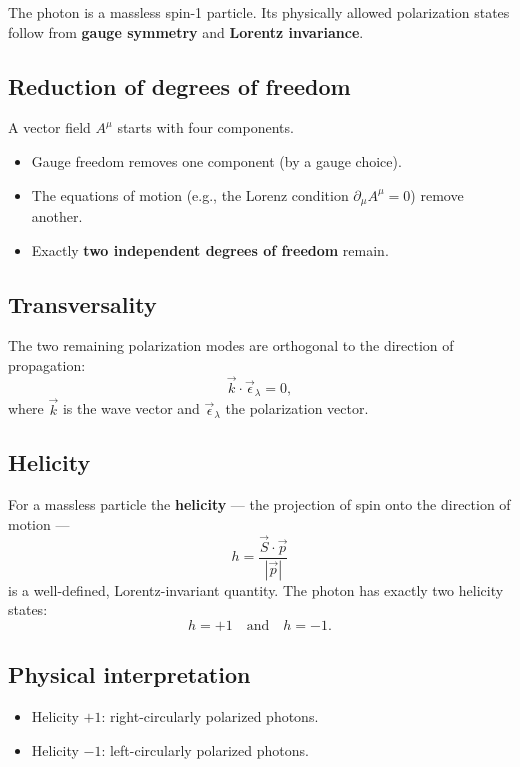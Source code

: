The photon is a massless spin-1 particle. Its physically allowed polarization states
follow from \textbf{gauge symmetry} and \textbf{Lorentz invariance}.

\subsection*{Reduction of degrees of freedom}
A vector field \( A^\mu \) starts with four components.
\begin{itemize}
	\item Gauge freedom removes one component (by a gauge choice).
	\item The equations of motion (e.g., the Lorenz condition \( \partial_\mu A^\mu = 0 \)) remove another.
	\item Exactly \textbf{two independent degrees of freedom} remain.
\end{itemize}

\subsection*{Transversality}
The two remaining polarization modes are orthogonal to the direction of propagation:
\[
\vec{k} \cdot \vec{\epsilon}_\lambda = 0,
\]
where \( \vec{k} \) is the wave vector and \( \vec{\epsilon}_\lambda \) the polarization vector.

\subsection*{Helicity}
For a massless particle the \textbf{helicity} — the projection of spin onto the direction of motion —
\[
h = \frac{\vec{S} \cdot \vec{p}}{|\vec{p}|}
\]
is a well-defined, Lorentz-invariant quantity.  
The photon has exactly two helicity states:
\[
h = +1 \quad \text{and} \quad h = -1 .
\]

\subsection*{Physical interpretation}
\begin{itemize}
	\item Helicity \( +1 \): right-circularly polarized photons.
	\item Helicity \( -1 \): left-circularly polarized photons.
\end{itemize}

